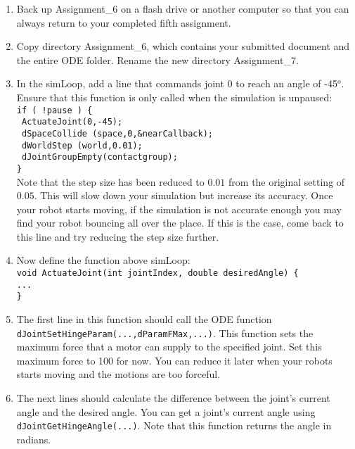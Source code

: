 \documentclass[12pt]{article}
\begin{document}
\begin{enumerate}

\item Back up Assignment\_6 on a flash drive or another computer so that you can always return to your completed fifth assignment.

\item Copy directory Assignment\_6, which contains your submitted document and the entire ODE folder. Rename the new directory Assignment\_7.

\item In the simLoop, add a line that commands joint 0 to reach an angle of -45$^o$. Ensure that this function is only called when the simulation is unpaused: \\
\texttt{if ( !pause ) \{} \\
\texttt{    ActuateJoint(0,-45);} \\
\texttt{    dSpaceCollide (space,0,\&nearCallback);} \\
\texttt{    dWorldStep (world,0.01);} \\
\texttt{    dJointGroupEmpty(contactgroup);} \\
\texttt{\}} \\
Note that the step size has been reduced to $0.01$ from the original setting of $0.05$. This will slow down your simulation but increase its accuracy. Once your robot starts moving, if the simulation is not accurate enough you may find your robot bouncing all over the place. If this is the case, come back to this line and try reducing the step size further.

\item Now define the function above simLoop: \\
\texttt{void ActuateJoint(int jointIndex, double desiredAngle) \{} \\
\texttt{...} \\
\texttt{\}}

\item The first line in this function should call the ODE function \\ \texttt{dJointSetHingeParam(...,dParamFMax,...)}. This function sets the maximum force that a motor can supply to the specified joint. Set this maximum force to 100 for now. You can reduce it later when your robots starts moving and the motions are too forceful.

\item The next lines should calculate the difference between the joint's current angle and the desired angle. You can get a joint's current angle using \texttt{dJointGetHingeAngle(...)}. Note that this function returns the angle in radians.


\end{enumerate}
\end{document}
